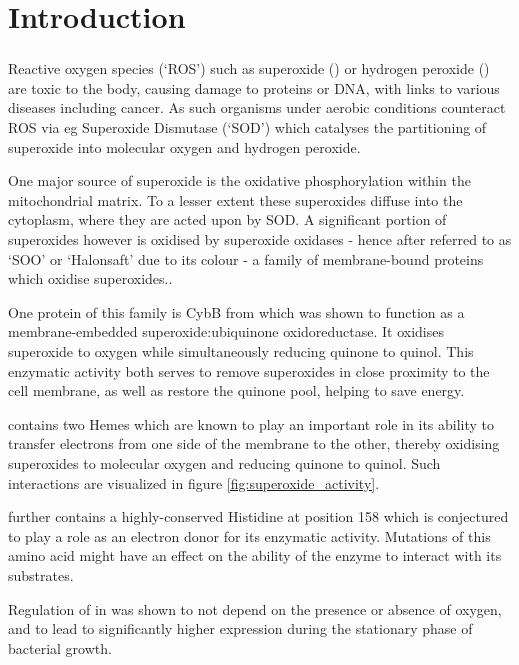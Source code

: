 \twocolumn

\part{Introduction}

\section{\hs{}}

Reactive oxygen species (`ROS') such as superoxide () or hydrogen
peroxide () are toxic to the body, causing damage to proteins or DNA,
with links to various diseases including cancer. As such organisms under
aerobic conditions counteract ROS via eg Superoxide Dismutase (`SOD') which
catalyses the partitioning of superoxide into molecular oxygen and hydrogen
peroxide.

One major source of superoxide is the oxidative phosphorylation within the
mitochondrial matrix. \cite{Novo2008} To a lesser extent these superoxides
diffuse into the cytoplasm, where they are acted upon by SOD. A significant
portion of superoxides however is oxidised by superoxide oxidases - hence after
referred to as `SOO' or `Halonsaft' due to its colour - a family of
membrane-bound proteins which oxidise superoxides.\cite{superoxide_salvaging}.

One protein of this family is CybB from \ecoli{} which was shown to function as
a membrane-embedded superoxide:ubiquinone oxidoreductase. It oxidises
superoxide to oxygen while simultaneously reducing quinone to
quinol.\cite{superoxide_salvaging} This enzymatic activity both serves to
remove superoxides in close proximity to the cell membrane, as well as restore
the quinone pool, helping to save energy.

\hs{} contains two Hemes which are known to play an important role in its
ability to transfer electrons from one side of the membrane to the other,
thereby oxidising superoxides to molecular oxygen and reducing quinone to
quinol.\cite{superoxide_salvaging} Such interactions are visualized in figure
\ref{fig:superoxide_activity}.

\hs{} further contains a highly-conserved Histidine at position 158 which is
conjectured to play a role as an electron donor for its enzymatic activity.
Mutations of this amino acid might have an effect on the ability of the enzyme
to interact with its substrates.\cite{superoxide_salvaging}

Regulation of \hs{} in \ecoli{} was shown to not depend on the presence or
absence of oxygen, and to lead to significantly higher expression during the
stationary phase of bacterial growth.\cite{superoxide_salvaging}

